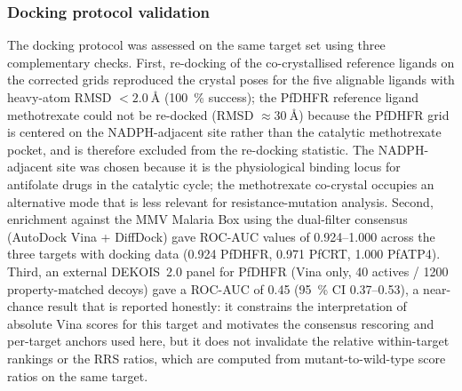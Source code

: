 \documentclass[journal=jcisd8,manuscript=article]{achemso}
\begin{document}
\subsubsection{Docking protocol validation}
The docking protocol was assessed on the same target set using three complementary checks. First, re-docking of the co-crystallised reference ligands on the corrected grids reproduced the crystal poses for the five alignable ligands with heavy-atom RMSD $< \SI{2.0}{\angstrom}$ (\qty{100}{\percent} success); the PfDHFR reference ligand methotrexate could not be re-docked (RMSD $\approx \SI{30}{\angstrom}$) because the PfDHFR grid is centered on the NADPH-adjacent site rather than the catalytic methotrexate pocket, and is therefore excluded from the re-docking statistic. The NADPH-adjacent site was chosen because it is the physiological binding locus for antifolate drugs in the catalytic cycle; the methotrexate co-crystal occupies an alternative mode that is less relevant for resistance-mutation analysis. Second, enrichment against the MMV Malaria Box using the dual-filter consensus (AutoDock Vina + DiffDock) gave ROC-AUC values of \numrange{0.924}{1.000} across the three targets with docking data (\num{0.924} PfDHFR, \num{0.971} PfCRT, \num{1.000} PfATP4). Third, an external DEKOIS~2.0 panel for PfDHFR (Vina only, \num{40} actives / \num{1200} property-matched decoys) gave a ROC-AUC of \num{0.45} (\qty{95}{\percent} CI \numrange{0.37}{0.53}), a near-chance result that is reported honestly: it constrains the interpretation of absolute Vina scores for this target and motivates the consensus rescoring and per-target anchors used here, but it does not invalidate the relative within-target rankings or the RRS ratios, which are computed from mutant-to-wild-type score ratios on the same target.
\end{document}
